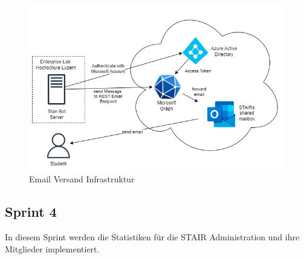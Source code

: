 \documentclass[a4paper, table]{article}
\begin{document}
\begin{figure}[h]
    \centering
    \includegraphics[width=1\textwidth]{img/Email_Infrastruktur.png}
    \caption{Email Versand Infrastruktur}
    \label{fig:send-email-infrastructure}
\end{figure}

\newpage
\subsection{Sprint 4}
In diesem Sprint werden die Statistiken für die STAIR Administration und ihre Mitglieder implementiert.
\end{document}
